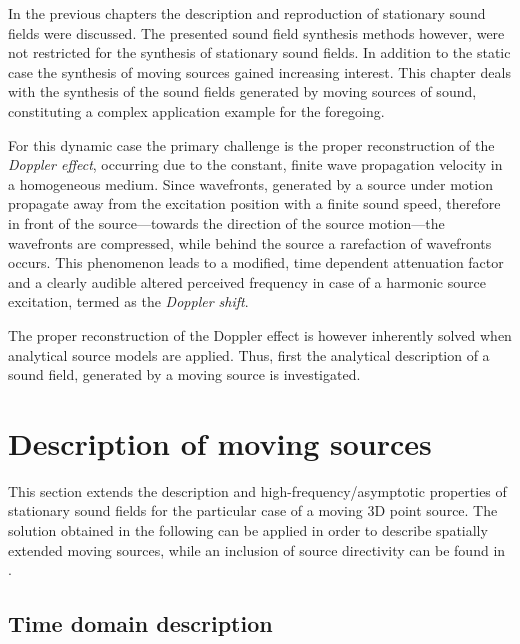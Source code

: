 In the previous chapters the description and reproduction of stationary sound fields were discussed.
The presented sound field synthesis methods however, were not restricted for the synthesis of stationary sound fields.
In addition to the static case the synthesis of moving sources gained increasing interest.
This chapter deals with the synthesis of the sound fields generated by moving sources of sound, constituting a complex application example for the foregoing.

For this dynamic case the primary challenge is the proper reconstruction of the \emph{Doppler effect}, occurring due to the constant, finite wave propagation velocity in a homogeneous medium.
Since wavefronts, generated by a source under motion propagate away from the excitation position with a finite sound speed, therefore in front of the source---towards the direction of the source motion---the wavefronts are compressed, while behind the source a rarefaction of wavefronts occurs.
This phenomenon leads to a modified, time dependent attenuation factor and a clearly audible altered perceived frequency in case of a harmonic source excitation, termed as the \emph{Doppler shift}.

The proper reconstruction of the Doppler effect is however inherently solved when analytical source models are applied.
Thus, first the analytical description of a sound field, generated by a moving source is investigated.

\section{Description of moving sources}

This section extends the description and high-frequency/asymptotic properties of stationary sound fields for the particular case of a moving 3D point source.
The solution obtained in the following can be applied in order to describe spatially extended moving sources, while an inclusion of source directivity can be found in \cite{Warren1976, Ahrens2011_moving_source_WFS}.

\subsection{Time domain description}
	

